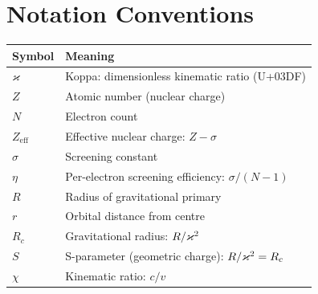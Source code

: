 \section{Notation Conventions}

\begin{center}
\begin{tabular}{ll}
\toprule
\textbf{Symbol} & \textbf{Meaning} \\
\midrule
$\varkappa$ & Koppa: dimensionless kinematic ratio (U+03DF) \\
$Z$ & Atomic number (nuclear charge) \\
$N$ & Electron count \\
$Z_{\text{eff}}$ & Effective nuclear charge: $Z - \sigma$ \\
$\sigma$ & Screening constant \\
$\eta$ & Per-electron screening efficiency: $\sigma/(N-1)$ \\
$R$ & Radius of gravitational primary \\
$r$ & Orbital distance from centre \\
$R_c$ & Gravitational radius: $R/\varkappa^2$ \\
$S$ & S-parameter (geometric charge): $R/\varkappa^2 = R_c$ \\
$\chi$ & Kinematic ratio: $c/v$ \\
\bottomrule
\end{tabular}
\end{center}
